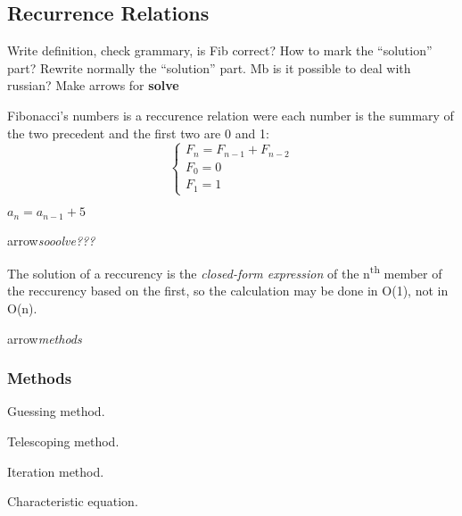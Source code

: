 \documentclass[a4paper,12pt]{article}
\begin{document}
\begin{center}
    \section*{Recurrence Relations}
\end{center}

\wip Write definition, check grammary, is Fib correct? How to mark the \enquote{solution} part? Rewrite normally the \enquote{solution} part. Mb is it possible to deal with russian? Make arrows for \textbf{solve} \etc

\ex Fibonacci's numbers is a reccurence relation were each number is the summary of the two precedent and the first two are 0 and 1:
$$\begin{cases}F_n = F_{n-1} + F_{n-2} \\
    F_0 = 0\\
    F_1 = 1\end{cases}$$

    $a_n = a_{n-1}+5$

arrow\emph{sooolve???}

The solution of a reccurency is the \emph{closed-form expression} of the n\textsuperscript{th} member of the reccurency based on the first, so the calculation may be done in O(1), not in O(n).

arrow\emph{methods}
\subsubsection*{Methods}
\begin{tasks}
    \item Guessing method.
    \item Telescoping method.
    \item Iteration method.
    \item Characteristic equation.
\end{tasks}
\end{document}
